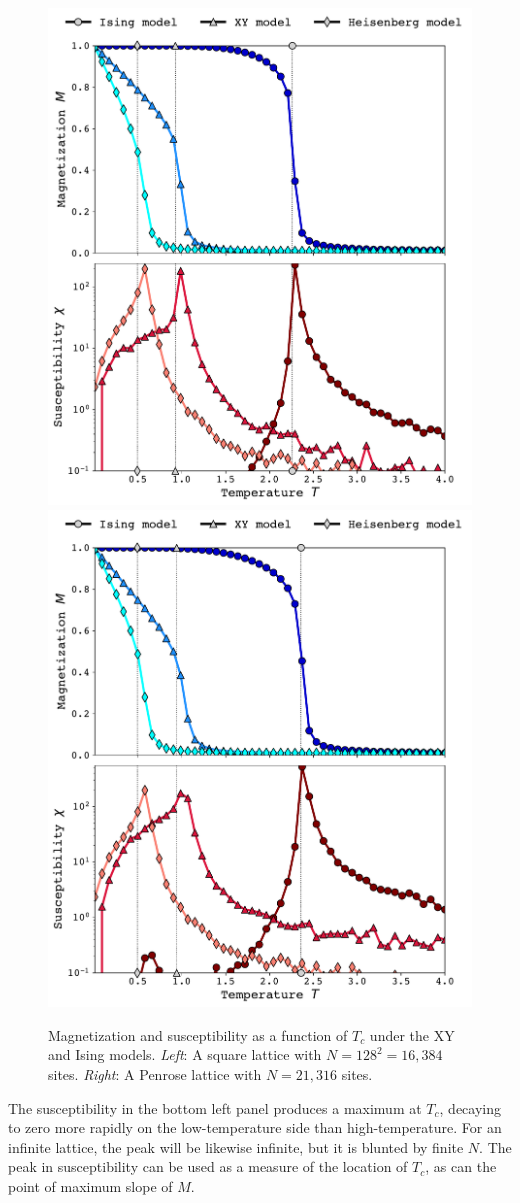 \documentclass[amsmath,amssymb,aps,twocolumn,nofootinbib]{revtex4-2}
\begin{document}
\begin{figure}
  \centering
  \includegraphics[width=0.49\linewidth]{../figs/square.pdf}\hfill
  \includegraphics[width=0.49\linewidth]{../figs/penrose.pdf}
  \caption{Magnetization and susceptibility as a function of $T_c$ under the XY and Ising models. \textit{Left}: A square lattice with $N=128^2=16,384$ sites. \textit{Right}: A Penrose lattice with $N=21,316$ sites.}
  \label{fig:square}
\end{figure}

The susceptibility in the bottom left panel produces a maximum at $T_c$, decaying to zero more rapidly on the low-temperature side than high-temperature. For an infinite lattice, the peak will be likewise infinite, but it is blunted by finite $N$. The peak in susceptibility can be used as a measure of the location of $T_c$, as can the point of maximum slope of $M$.
\end{document}
